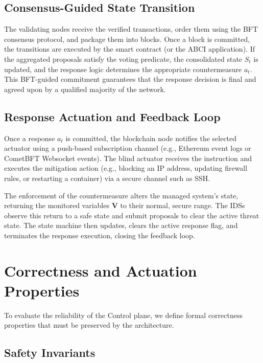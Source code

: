 \subsection{Consensus-Guided State Transition}
\label{subsec:consensus_exec}

The validating nodes receive the verified transactions, order them using the BFT consensus protocol, and package them into blocks. Once a block is committed, the transitions are executed by the smart contract (or the ABCI application). If the aggregated proposals satisfy the voting predicate, the consolidated state $S_t$ is updated, and the response logic determines the appropriate countermeasure $a_t$. This BFT-guided commitment guarantees that the response decision is final and agreed upon by a qualified majority of the network.

\subsection{Response Actuation and Feedback Loop}
\label{subsec:stage_actuation}

Once a response $a_t$ is committed, the blockchain node notifies the selected actuator using a push-based subscription channel (e.g., Ethereum event logs or CometBFT Websocket events). The blind actuator receives the instruction and executes the mitigation action (e.g., blocking an IP address, updating firewall rules, or restarting a container) via a secure channel such as SSH. 

The enforcement of the countermeasure alters the managed system's state, returning the monitored variables $\mathbf{V}$ to their normal, secure range. The IDSs observe this return to a safe state and submit proposals to clear the active threat state. The state machine then updates, clears the active response flag, and terminates the response execution, closing the feedback loop.

\section{Correctness and Actuation Properties}
\label{sec:act_plane_properties}

To evaluate the reliability of the Control plane, we define formal correctness properties that must be preserved by the architecture.

\subsection{Safety Invariants}
\label{subsec:act_safety}

